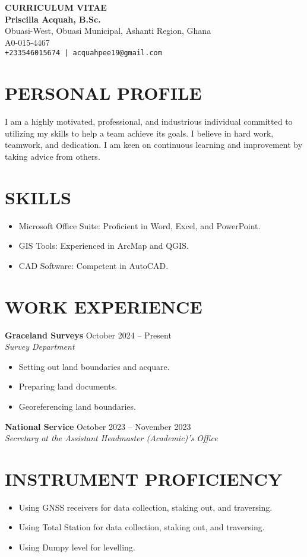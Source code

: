\documentclass[a4paper,10pt]{article}
\begin{document}
\begin{center}
    {\LARGE \textbf{CURRICULUM VITAE}} \\[0.5cm]
    \textbf{Priscilla Acquah, B.Sc.} \\
    Obuasi-West, Obuasi Municipal, Ashanti Region, Ghana \\
    A0-015-4467 \\
    \texttt{+233546015674 | acquahpee19@gmail.com} 
\end{center}


\section*{PERSONAL PROFILE}
I am a highly motivated, professional, and industrious individual committed to utilizing my skills to help a team achieve its goals. I believe in hard work, teamwork, and dedication. I am keen on continuous learning and improvement by taking advice from others.

\section*{SKILLS}
\begin{itemize}
    \item Microsoft Office Suite: Proficient in Word, Excel, and PowerPoint.
    \item GIS Tools: Experienced in ArcMap and QGIS.
    \item CAD Software: Competent in AutoCAD.
\end{itemize}

\section*{WORK EXPERIENCE}
\textbf{Graceland Surveys} \hfill October 2024 – Present \\
\textit{Survey Department}
\begin{itemize}
    \item Setting out land boundaries and acquare.
    \item Preparing land documents.
    \item Georeferencing land boundaries.
\end{itemize}

\textbf{National Service} \hfill October 2023 – November 2023 \\
\textit{Secretary at the Assistant Headmaster (Academic)’s Office}

\section*{INSTRUMENT PROFICIENCY}
\begin{itemize}
    \item Using GNSS receivers for data collection, staking out, and traversing.
    \item Using Total Station for data collection, staking out, and traversing.
    \item Using Dumpy level for levelling.
\end{itemize}
\end{document}

